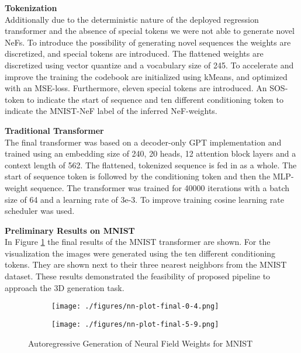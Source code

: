 \noindent
\textbf{Tokenization}\\
Additionally due to the deterministic nature of the deployed regression transformer and the absence of special tokens we were not able to generate novel NeFs. To introduce the possibility of generating novel sequences the weights are discretized, and special tokens are introduced. The flattened weights are discretized using vector quantize and a vocabulary size of 245. To accelerate and improve the training the codebook are initialized using kMeans, and optimized with an MSE-loss. Furthermore, eleven special tokens are introduced. An SOS-token to indicate the start of sequence and ten different conditioning token to indicate the MNIST-NeF label of the inferred NeF-weights.
\vspace{1em}

\noindent
\textbf{Traditional Transformer}\\
The final transformer was based on a decoder-only GPT implementation \cite{Karpathy2022} and trained using an embedding size of 240, 20 heads, 12 attention block layers and a context length of 562. The flattened, tokenized sequence is fed in as a whole. The start of sequence token is followed by the conditioning token and then the MLP-weight sequence. The transformer was trained for 40000 iterations with a batch size of 64 and a learning rate of 3e-3. To improve training cosine learning rate scheduler was used.
\vspace{1em}

\noindent
\textbf{Preliminary Results on MNIST}\\
In Figure \ref{fig:mnist} the final results of the MNIST transformer are shown. For the visualization the images were generated using the ten different conditioning tokens. They are shown next to their three nearest neighbors from the MNIST dataset. These results demonstrated the feasibility of proposed pipeline to approach the 3D generation task.

\begin{figure}[H]
  \begin{mdframed}[backgroundcolor=mnistbg]

    \centering
    \begin{subfigure}{.5\linewidth}
      \centering
      \texttt{[image: ./figures/nn-plot-final-0-4.png]}
    \end{subfigure}%
    \begin{subfigure}{.5\linewidth}
      \centering
      \texttt{[image: ./figures/nn-plot-final-5-9.png]}
    \end{subfigure}

  \end{mdframed}
  \caption{\label{fig:mnist} Autoregressive Generation of Neural Field Weights for MNIST}
\end{figure}


